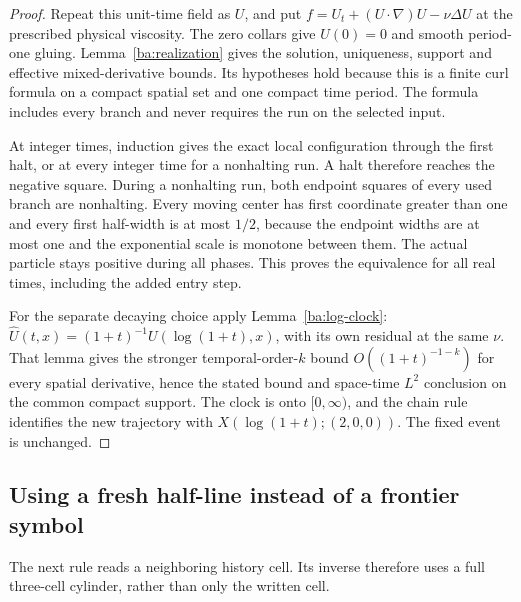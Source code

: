 \begin{proof}
Repeat this unit-time field as $U$, and put
$f=U_t+(U\cdot\nabla)U-\nu\Delta U$ at the prescribed physical
viscosity.  The zero collars give $U(0)=0$ and smooth period-one gluing.
Lemma~\ref{ba:realization} gives the solution, uniqueness, support and
effective mixed-derivative bounds.  Its hypotheses hold because this is
a finite curl formula on a compact spatial set and one compact time
period.  The formula includes every branch and never requires the run
on the selected input.

At integer times, induction gives the exact local configuration through
the first halt, or at every integer time for a nonhalting run.  A halt
therefore reaches the negative square.  During a nonhalting run, both
endpoint squares of every used branch are nonhalting.  Every moving
center has first coordinate greater than one and every first half-width
is at most $1/2$, because the endpoint widths are at most one and the
exponential scale is monotone between them.  The actual particle stays
positive during all phases.  This proves the equivalence for all real
times, including the added entry step.

For the separate decaying choice apply Lemma~\ref{ba:log-clock}:
$\widehat U(t,x)=(1+t)^{-1}U(\log(1+t),x)$, with its own residual at
the same $\nu$.  That lemma gives the stronger temporal-order-$k$
bound $O((1+t)^{-1-k})$ for every spatial derivative, hence the stated
bound and space-time $L^2$ conclusion on the common compact support.
The clock is onto $[0,\infty)$, and the chain rule identifies the new
trajectory with $X(\log(1+t);(2,0,0))$.  The fixed event is unchanged.
\end{proof}


\subsection{Using a fresh half-line instead of a frontier symbol}

The next rule reads a neighboring history cell.  Its inverse therefore
uses a full three-cell cylinder, rather than only the written cell.

